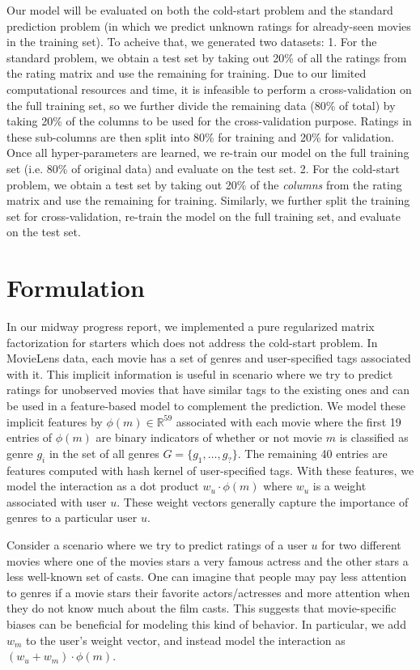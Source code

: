 \documentclass{article} %
\begin{document}
Our model will be evaluated on both the cold-start problem and the standard prediction problem (in which we predict unknown ratings for already-seen movies in the training set). To acheive that, we generated two datasets: 1. For the standard problem, we obtain a test set by taking out 20\% of all the ratings from the rating matrix and use the remaining for training. Due to our limited computational resources and time, it is infeasible to perform a cross-validation on the full training set, so we further divide the remaining data (80\% of total) by taking 20\% of the columns to be used for the cross-validation purpose. Ratings in these sub-columns are then split into 80\% for training and 20\% for validation. Once all hyper-parameters are learned, we re-train our model on the full training set (i.e. 80\% of original data) and evaluate on the test set. 2. For the cold-start problem, we obtain a test set by taking out 20\% of the {\em columns} from the rating matrix and use the remaining for training. Similarly, we further split the training set for cross-validation, re-train the model on the full training set, and evaluate on the test set.
\section{Formulation}
In our midway progress report, we implemented a pure regularized matrix factorization for starters which does not address the cold-start problem. In MovieLens data, each movie has a set of genres and user-specified tags associated with it. This implicit information is useful in scenario where we try to predict ratings for unobserved movies that have similar tags to the existing ones and can be used in a feature-based model to complement the prediction. We model these implicit features by $\phi(m) \in \mathbb{R}^{59}$ associated with each movie where the first 19 entries of $\phi(m)$ are binary indicators of whether or not movie $m$ is classified as genre $g_i$ in the set of all genres $G = \{g_1,\ldots, g_?\}$. The remaining 40 entries are features computed with hash kernel of user-specified tags. With these features, we model the interaction as a dot product $w_u \cdot \phi(m)$ where $w_u$ is a weight associated with user $u$. These weight vectors generally capture the importance of genres to a particular user $u$.

Consider a scenario where we try to predict ratings of a user $u$ for two different movies where one of the movies stars a very famous actress and the other stars a less well-known set of casts. One can imagine that people may pay less attention to genres if a movie stars their favorite actors/actresses and more attention when they do not know much about the film casts. This suggests that movie-specific biases can be beneficial for modeling this kind of behavior. In particular, we add $w_m$ to the user's weight vector, and instead model the interaction as $(w_u + w_m) \cdot \phi(m)$.
 
\end{document}
